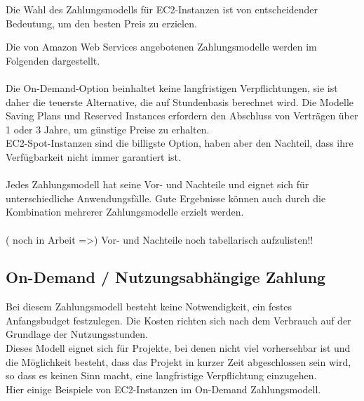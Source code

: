 Die Wahl des Zahlungsmodells für EC2-Instanzen ist von entscheidender Bedeutung, um den besten Preis zu erzielen.

Die von Amazon Web Services angebotenen Zahlungsmodelle werden im Folgenden dargestellt.
\\\\
Die On-Demand-Option %
beinhaltet keine langfristigen Verpflichtungen, sie ist daher die teuerste Alternative, die auf Stundenbasis berechnet wird. Die Modelle Saving Plans und Reserved Instances erfordern den Abschluss von Verträgen über 1 oder 3 Jahre, um günstige Preise zu erhalten.
\\
EC2-Spot-Instanzen sind die billigste Option, haben aber den Nachteil, dass ihre Verfügbarkeit nicht immer garantiert ist.
\\\\
Jedes Zahlungsmodell hat seine Vor- und Nachteile und eignet sich für unterschiedliche Anwendungsfälle. Gute Ergebnisse können auch durch die Kombination mehrerer Zahlungsmodelle erzielt werden.
\\\\
( noch in Arbeit =>)
Vor- und Nachteile noch tabellarisch aufzulisten!!


\subsection{On-Demand / Nutzungsabhängige Zahlung}
Bei diesem Zahlungsmodell besteht keine Notwendigkeit, ein festes Anfangsbudget festzulegen. Die Kosten richten sich nach dem Verbrauch auf der Grundlage der Nutzungsstunden.
\\
Dieses Modell eignet sich für Projekte, bei denen nicht viel vorhersehbar ist und die Möglichkeit besteht, dass das Projekt in kurzer Zeit abgeschlossen sein wird, so dass es keinen Sinn macht, eine langfristige Verpflichtung einzugehen.
\\
Hier einige Beispiele von EC2-Instanzen im On-Demand Zahlungsmodell.

